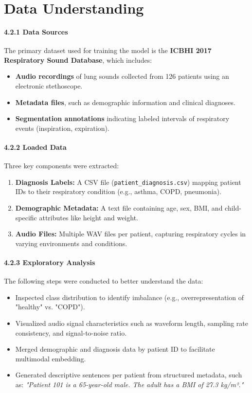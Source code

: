\section{Data Understanding}

\paragraph{4.2.1 Data Sources \\}
The primary dataset used for training the model is the \textbf{ICBHI 2017 Respiratory Sound Database}, which includes:
\begin{itemize}
    \item \textbf{Audio recordings} of lung sounds collected from 126 patients using an electronic stethoscope.
    \item \textbf{Metadata files}, such as demographic information and clinical diagnoses.
    \item \textbf{Segmentation annotations} indicating labeled intervals of respiratory events (inspiration, expiration).
\end{itemize}

\paragraph{4.2.2 Loaded Data\\}
Three key components were extracted:
\begin{enumerate}
    \item \textbf{Diagnosis Labels:} A CSV file (\texttt{patient\_diagnosis.csv}) mapping patient IDs to their respiratory condition (e.g., asthma, COPD, pneumonia).
    \item \textbf{Demographic Metadata:} A text file containing age, sex, BMI, and child-specific attributes like height and weight.
    \item \textbf{Audio Files:} Multiple WAV files per patient, capturing respiratory cycles in varying environments and conditions.
\end{enumerate}

\paragraph{4.2.3 Exploratory Analysis\\}
The following steps were conducted to better understand the data:
\begin{itemize}
    \item Inspected class distribution to identify imbalance (e.g., overrepresentation of "healthy" vs. "COPD").
    \item Visualized audio signal characteristics such as waveform length, sampling rate consistency, and signal-to-noise ratio.
    \item Merged demographic and diagnosis data by patient ID to facilitate multimodal embedding.
    \item Generated descriptive sentences per patient from structured metadata, such as:
    \textit{"Patient 101 is a 65-year-old male. The adult has a BMI of 27.3 kg/m²."}
\end{itemize}

